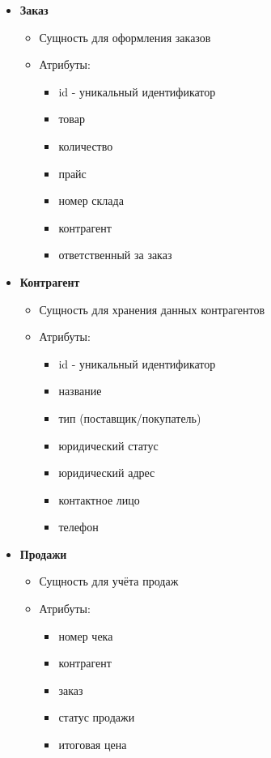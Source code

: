 \begin{itemize}
	\item \textbf{Заказ}
	\begin{itemize}
		\item Сущность для оформления заказов
		\item Атрибуты:
		\begin{itemize}
			\item id - уникальный идентификатор
			\item товар
			\item количество
			\item прайс
			\item номер склада
			\item контрагент
			\item ответственный за заказ
		\end{itemize}
	\end{itemize}
	
	\item \textbf{Контрагент}
	\begin{itemize}
		\item Сущность для хранения данных контрагентов
		\item Атрибуты:
		\begin{itemize}
			\item id - уникальный идентификатор
			\item название
			\item тип (поставщик/покупатель)
			\item юридический статус
			\item юридический адрес
			\item контактное лицо
			\item телефон
		\end{itemize}
	\end{itemize}
	
	\item \textbf{Продажи}
	\begin{itemize}
		\item Сущность для учёта продаж
		\item Атрибуты:
		\begin{itemize}
			\item номер чека
			\item контрагент
			\item заказ
			\item статус продажи
			\item итоговая цена
		\end{itemize}
	\end{itemize}
	

\end{itemize}

